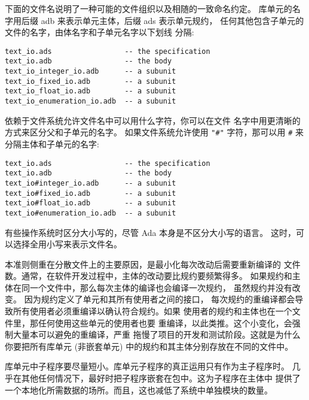 \begin{blockindent}
下面的文件名说明了一种可能的文件组织以及相随的一致命名约定。
库单元的名字用后缀 adb 来表示单元主体，后缀 ads 表示单元规约，
任何其他包含子单元的文件的名字，由体名字和子单元名字以下划线
分隔:
\begin{lstlisting}
text_io.ads                 -- the specification
text_io.adb                 -- the body
text_io_integer_io.adb      -- a subunit
text_io_fixed_io.adb        -- a subunit
text_io_float_io.adb        -- a subunit
text_io_enumeration_io.adb  -- a subunit
\end{lstlisting}

依赖于文件系统允许文件名中可以用什么字符，你可以在文件
名字中用更清晰的方式来区分父和子单元的名字。
如果文件系统允许使用 \texttt{"#"} 字符，那可以用 \texttt{#}
来分隔主体和子单元的名字:
\begin{lstlisting}
text_io.ads                 -- the specification
text_io.adb                 -- the body
text_io#integer_io.adb      -- a subunit
text_io#fixed_io.adb        -- a subunit
text_io#float_io.adb        -- a subunit
text_io#enumeration_io.adb  -- a subunit
\end{lstlisting}

有些操作系统时区分大小写的，尽管 Ada 本身是不区分大小写的语言。
这时，可以选择全用小写来表示文件名。
\end{blockindent}

\begin{blockindent}
本准则侧重在分散文件上的主要原因，是最小化每次改动后需要重新编译的
文件数。通常，在软件开发过程中，主体的改动要比规约要频繁得多。
如果规约和主体在同一个文件中，那么每次主体的编译也会编译一次规约，
虽然规约并没有改变。 因为规约定义了单元和其所有使用者之间的接口，
每次规约的重编译都会导致所有使用者必须重编译以确认符合规约。如果
使用者的规约和主体也在一个文件里，那任何使用这些单元的使用者也要
重编译，以此类推。这个小变化，会强制大量本可以避免的重编译，严重
拖慢了项目的开发和测试阶段。这就是为什么你要把所有库单元 (非嵌套单元)
中的规约和其主体分别存放在不同的文件中。

库单元中子程序要尽量短小。库单元子程序的真正运用只有作为主子程序时。
几乎在其他任何情况下，最好时把子程序嵌套在包中。这为子程序在主体中
提供了一个本地化所需数据的场所。而且，这也减低了系统中单独模块的数量。
\end{blockindent}
